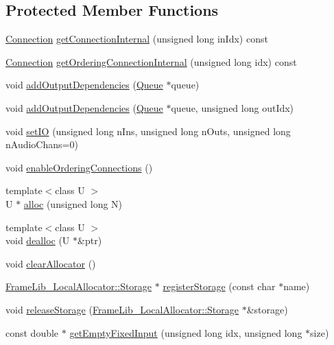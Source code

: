 \subsection*{Protected Member Functions}
\begin{DoxyCompactItemize}
\item 
\hyperlink{struct_frame_lib___object_1_1_connection}{Connection} \hyperlink{class_frame_lib___object_acd33f63f6755575ad4eebabe6b7e2aaa}{get\+Connection\+Internal} (unsigned long in\+Idx) const
\item 
\hyperlink{struct_frame_lib___object_1_1_connection}{Connection} \hyperlink{class_frame_lib___object_ac6075f11200b91f9a133344190a64dc4}{get\+Ordering\+Connection\+Internal} (unsigned long idx) const
\item 
void \hyperlink{class_frame_lib___object_ac59c8a2828c43887ee4093fb1cbe3f9a}{add\+Output\+Dependencies} (\hyperlink{class_frame_lib___object_a3e6fce9a979bf08406e40e51583cb4ea}{Queue} $\ast$queue)
\item 
void \hyperlink{class_frame_lib___object_aaf9637ffd5654f73014c2750cfa54bae}{add\+Output\+Dependencies} (\hyperlink{class_frame_lib___object_a3e6fce9a979bf08406e40e51583cb4ea}{Queue} $\ast$queue, unsigned long out\+Idx)
\item 
void \hyperlink{class_frame_lib___object_a5c34227ace795af7da847fff3f2b300d}{set\+IO} (unsigned long n\+Ins, unsigned long n\+Outs, unsigned long n\+Audio\+Chans=0)
\item 
void \hyperlink{class_frame_lib___object_a60dba6cd7148c3223adb4197d6712839}{enable\+Ordering\+Connections} ()
\item 
{\footnotesize template$<$class U $>$ }\\U $\ast$ \hyperlink{class_frame_lib___object_a32ba9cf8b728317fc92c10310ab83e67}{alloc} (unsigned long N)
\item 
{\footnotesize template$<$class U $>$ }\\void \hyperlink{class_frame_lib___object_ab42be79621db7363ca4a34f63704d04f}{dealloc} (U $\ast$\&ptr)
\item 
void \hyperlink{class_frame_lib___object_a33b99de2c7a35227bc8a40d4c3b2ee76}{clear\+Allocator} ()
\item 
\hyperlink{class_frame_lib___local_allocator_1_1_storage}{Frame\+Lib\+\_\+\+Local\+Allocator\+::\+Storage} $\ast$ \hyperlink{class_frame_lib___object_a316d15b17757ddfef4341d0f8afe443e}{register\+Storage} (const char $\ast$name)
\item 
void \hyperlink{class_frame_lib___object_a4c131dff9d634f17696fb3ae6be06e9b}{release\+Storage} (\hyperlink{class_frame_lib___local_allocator_1_1_storage}{Frame\+Lib\+\_\+\+Local\+Allocator\+::\+Storage} $\ast$\&storage)
\item 
const double $\ast$ \hyperlink{class_frame_lib___object_a604899fbd09fd9b37502ecb07a831b30}{get\+Empty\+Fixed\+Input} (unsigned long idx, unsigned long $\ast$size)
\end{DoxyCompactItemize}
